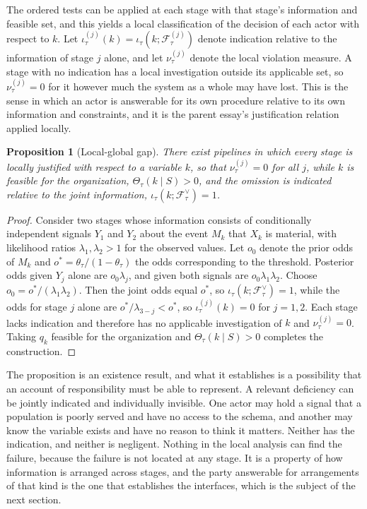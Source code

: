 \documentclass[11pt]{article}
\newcommand{\F}{\mathcal F}
\newcommand{\Th}{\Theta}
\theoremstyle{plain}
\newtheorem{proposition}{Proposition}
\theoremstyle{definition}
\begin{document}
The ordered tests can be applied at each stage with that stage's information and feasible set, and this yields a local classification of the decision of each actor with respect to $k$. Let $\iota^{(j)}_\tau(k)=\iota_\tau(k;\F^{(j)}_\tau)$ denote indication relative to the information of stage $j$ alone, and let $\nu^{(j)}_\tau$ denote the local violation measure. A stage with no indication has a local investigation outside its applicable set, so $\nu^{(j)}_\tau=0$ for it however much the system as a whole may have lost. This is the sense in which an actor is answerable for its own procedure relative to its own information and constraints, and it is the parent essay's justification relation applied locally.

\begin{proposition}[Local-global gap]\label{prop:gap}
There exist pipelines in which every stage is locally justified with respect to a variable $k$, so that $\nu^{(j)}_\tau=0$ for all $j$, while $k$ is feasible for the organization, $\Th_\tau(k\mid S)>0$, and the omission is indicated relative to the joint information, $\iota_\tau(k;\F^{\vee}_\tau)=1$.
\end{proposition}

\begin{proof}
Consider two stages whose information consists of conditionally independent signals $Y_1$ and $Y_2$ about the event $M_k$ that $X_k$ is material, with likelihood ratios $\lambda_1,\lambda_2>1$ for the observed values. Let $o_0$ denote the prior odds of $M_k$ and $o^{*}=\theta_\tau/(1-\theta_\tau)$ the odds corresponding to the threshold. Posterior odds given $Y_j$ alone are $o_0\lambda_j$, and given both signals are $o_0\lambda_1\lambda_2$. Choose $o_0=o^{*}/(\lambda_1\lambda_2)$. Then the joint odds equal $o^{*}$, so $\iota_\tau(k;\F^{\vee}_\tau)=1$, while the odds for stage $j$ alone are $o^{*}/\lambda_{3-j}<o^{*}$, so $\iota^{(j)}_\tau(k)=0$ for $j=1,2$. Each stage lacks indication and therefore has no applicable investigation of $k$ and $\nu^{(j)}_\tau=0$. Taking $q_k$ feasible for the organization and $\Th_\tau(k\mid S)>0$ completes the construction.
\end{proof}

The proposition is an existence result, and what it establishes is a possibility that an account of responsibility must be able to represent. A relevant deficiency can be jointly indicated and individually invisible. One actor may hold a signal that a population is poorly served and have no access to the schema, and another may know the variable exists and have no reason to think it matters. Neither has the indication, and neither is negligent. Nothing in the local analysis can find the failure, because the failure is not located at any stage. It is a property of how information is arranged across stages, and the party answerable for arrangements of that kind is the one that establishes the interfaces, which is the subject of the next section.
\end{document}
